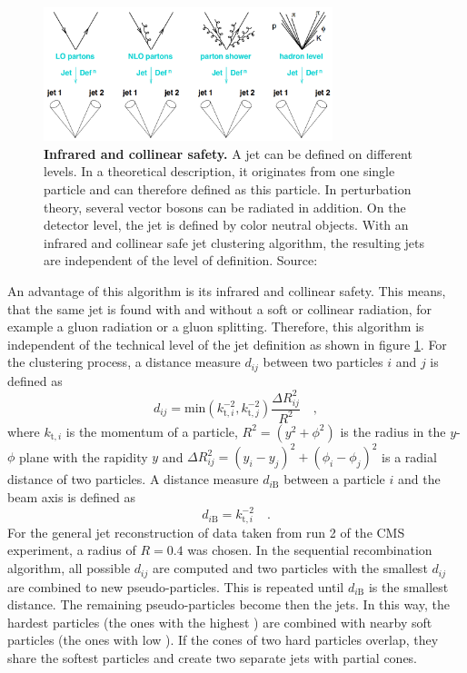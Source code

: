\begin{figure}
\centering
\includegraphics[width=0.75\textwidth]{assets/IRCsafety.png}
\caption[Infrared and Collinear Safety of Jets]{\textbf{Infrared and collinear safety.} A jet can be defined on different levels. In a theoretical description, it originates from one single particle and can therefore defined as this particle. In perturbation theory, several vector bosons can be radiated in addition. On the detector level, the jet is defined by color neutral objects. With an infrared and collinear safe jet clustering algorithm, the resulting jets are independent of the level of definition. Source: \cite{ICLsafe}}
\label{fig:ch_3_IRCsafety}
\end{figure}

An advantage of this algorithm is its infrared and collinear safety. This means, that the same jet is found with and without a soft or collinear radiation, for example a gluon radiation or a gluon splitting. Therefore, this algorithm is independent of the technical level of the jet definition as shown in figure \ref{fig:ch_3_IRCsafety}. For the clustering process, a distance measure $d_{ij}$ between two particles $i$ and $j$ is defined as
\begin{equation}
d_{ij} = \textrm{min}(k_{\textrm{t},i}^{-2},k_{\textrm{t},j}^{-2})\frac{\Delta R^2_{ij}}{R^2} \quad ,
\end{equation}
where $k_{\textrm{t},i}$ is the momentum of a particle, $R^2 = (y^2 + \phi^2)$ is the radius in the $y$-$\phi$ plane with the rapidity $y$ and $\Delta R^2_{ij} = (y_i - y_j)^2 + (\phi_i - \phi_j)^2$ is a radial distance of two particles. A distance measure $ d_{i\textrm{B}}$ between a particle $i$ and the beam axis is defined as
\begin{equation}
d_{i\textrm{B}} = k^{-2}_{\textrm{t},i} \quad .
\end{equation}
For the general jet reconstruction of data taken from run 2 of the CMS experiment, a radius of $R=0.4$ was chosen. In the sequential recombination algorithm, all possible $d_{ij}$ are computed and two particles with the smallest $d_{ij}$ are combined to new pseudo-particles. This is repeated until $d_{i\textrm{B}}$ is the smallest distance. The remaining pseudo-particles become then the jets. In this way, the hardest particles (the ones with the highest \pt) are combined with nearby soft particles (the ones with low \pt). If the cones of two hard particles overlap, they share the softest particles and create two separate jets with partial cones. 

